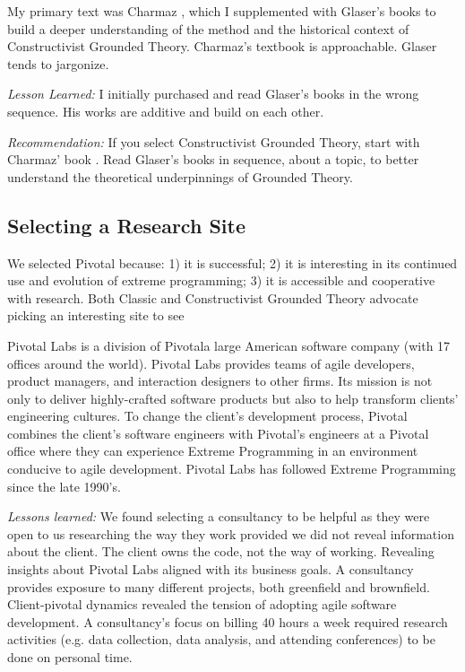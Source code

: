 My primary text was Charmaz \cite{Charmaz}, which I supplemented with Glaser's books \cite{GlaserDiscovery, GlaserTheoreticalSensitivity, GlaserIssues} to build a deeper understanding of the method and the historical context of Constructivist Grounded Theory. Charmaz's textbook is approachable. Glaser tends to jargonize.

\textit{Lesson Learned:} I initially purchased and read Glaser's books in the wrong sequence. His works are additive and build on each other.

\textit{Recommendation:} If you select Constructivist Grounded Theory, start with Charmaz' book \cite{Charmaz}. Read Glaser's books in sequence, about a topic, to better understand the theoretical underpinnings of Grounded Theory. 

\subsection{Selecting a Research Site}
We selected Pivotal because: 1) it is successful; 2) it is interesting in its continued use and evolution of extreme programming; 3) it is accessible and cooperative with research. Both Classic and Constructivist Grounded Theory advocate picking an interesting site to see  

Pivotal Labs is a division of Pivotal\textemdash a large American software company (with 17 offices around the world). Pivotal Labs provides teams of agile developers, product managers, and interaction designers to other firms. Its mission is not only to deliver highly-crafted software products but also to help transform clients' engineering cultures. To change the client's development process, Pivotal combines the client's software engineers with Pivotal's engineers at a Pivotal office where they can experience Extreme Programming \cite{BeckExtremeProgramming2004} in an environment conducive to agile development. Pivotal Labs has followed Extreme Programming \cite{BeckExtremeProgramming2004} since the late 1990's. 

\textit{Lessons learned:} We found selecting a consultancy to be helpful as they were open to us researching the way they work provided we did not reveal information about the client. The client owns the code, not the way of working. Revealing insights about Pivotal Labs aligned with its business goals. A consultancy provides exposure to many different projects, both greenfield and brownfield. Client-pivotal dynamics revealed the tension of adopting agile software development. A consultancy's focus on billing 40 hours a week required research activities (e.g. data collection, data analysis, and attending conferences) to be done on personal time.

